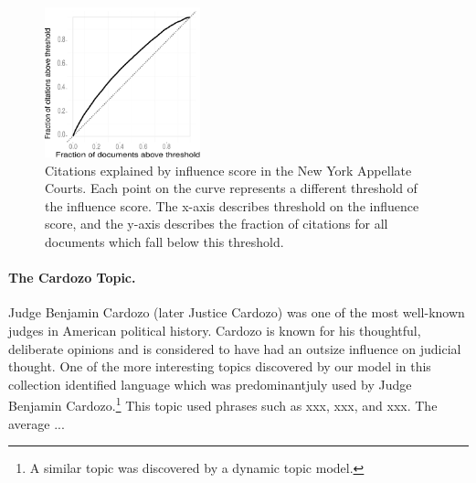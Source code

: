 \begin{figure}
  \center
  \includegraphics[width=0.4\textwidth]{chapter_influence/figures/fraction_docs_vs_fraction_citations.pdf}
  \caption{Citations explained by influence score in the New York Appellate Courts.  Each point on the curve represents a different threshold of the influence score.  The x-axis describes threshold on the influence score, and the y-axis describes the fraction of citations for all documents which fall below this threshold.}
  \label{fig:nyca_citations_explained}
\end{figure}



\paragraph{The Cardozo Topic.} Judge Benjamin Cardozo (later Justice
Cardozo) was one of the most well-known judges in American political
history.  Cardozo is known for his thoughtful, deliberate opinions and
is considered to have had an outsize influence on judicial thought.
One of the more interesting topics discovered by our model in this
collection identified language which was predominantjuly used by Judge
Benjamin Cardozo.\footnote{A similar topic was discovered by a dynamic
  topic model.}  This topic used phrases such as xxx, xxx, and
xxx. The average ...
